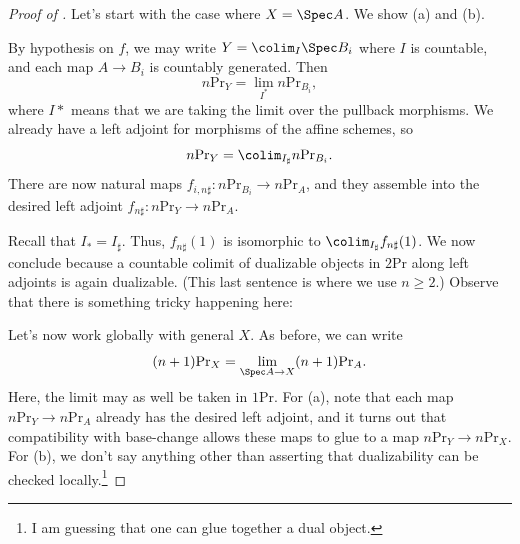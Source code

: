 \documentclass[../notes.tex]{subfiles}
\begin{document}
\begin{proof}[Proof of ]
	Let's start with the case where $X=\Spec A$. We show (a) and (b).
	\begin{listalph}
		\item By hypothesis on $f$, we may write $Y=\colim_I\Spec B_i$ where $I$ is countable, and each map $A\to B_i$ is countably generated. Then
		\[n\mathrm{Pr}_Y=\lim_{I^*}n\mathrm{Pr}_{B_i},\]
		where $I*$ means that we are taking the limit over the pullback morphisms. We already have a left adjoint for morphisms of the affine schemes, so
		\[n\mathrm{Pr}_Y=\colim_{I_\sharp}n\mathrm{Pr}_{B_i}.\]
		There are now natural maps $f_{i,n\sharp}\colon n\mathrm{Pr}_{B_i}\to n\mathrm{Pr}_A$, and they assemble into the desired left adjoint $f_{n\sharp}\colon n\mathrm{Pr}_Y\to n\mathrm{Pr}_A$.
		\item Recall that $I_*=I_\sharp$. Thus, $f_{n\sharp}(1)$ is isomorphic to $\colim_{I_\sharp}f_{n\sharp}(1)$. We now conclude because a countable colimit of dualizable objects in $2\mathrm{Pr}$ along left adjoints is again dualizable. (This last sentence is where we use $n\ge2$.) Observe that there is something tricky happening here: 
	\end{listalph}
	Let's now work globally with general $X$. As before, we can write
	\[(n+1)\mathrm{Pr}_X=\lim_{\Spec A\to X}(n+1)\mathrm{Pr}_A.\]
	Here, the limit may as well be taken in $1\mathrm{Pr}$. For (a), note that each map $n\mathrm{Pr}_Y\to n\mathrm{Pr}_A$ already has the desired left adjoint, and it turns out that compatibility with base-change allows these maps to glue to a map $n\mathrm{Pr}_Y\to n\mathrm{Pr}_X$. For (b), we don't say anything other than asserting that dualizability can be checked locally.\footnote{I am guessing that one can glue together a dual object.}


\end{proof}
\end{document}
